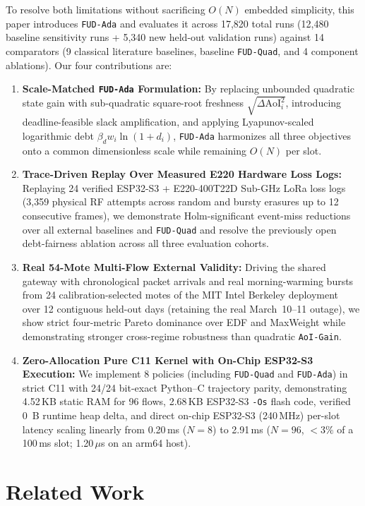 \documentclass[journal]{IEEEtran}
\begin{document}
To resolve both limitations without sacrificing $O(N)$ embedded simplicity, this paper introduces \texttt{FUD-Ada} and evaluates it across 17,820 total runs (12,480 baseline sensitivity runs + 5,340 new held-out validation runs) against 14 comparators (9 classical literature baselines, baseline \texttt{FUD-Quad}, and 4 component ablations). Our four contributions are:
\begin{enumerate}
\item \textbf{Scale-Matched \texttt{FUD-Ada} Formulation:} By replacing unbounded quadratic state gain with sub-quadratic square-root freshness $\sqrt{\Delta\text{AoI}_i^2}$, introducing deadline-feasible slack amplification, and applying Lyapunov-scaled logarithmic debt $\beta_d w_i \ln(1{+}d_i)$, \texttt{FUD-Ada} harmonizes all three objectives onto a common dimensionless scale while remaining $O(N)$ per slot.
\item \textbf{Trace-Driven Replay Over Measured E220 Hardware Loss Logs:} Replaying 24 verified ESP32-S3 + E220-400T22D Sub-GHz LoRa loss logs (3,359 physical RF attempts across random and bursty erasures up to 12 consecutive frames), we demonstrate Holm-significant event-miss reductions over all external baselines and \texttt{FUD-Quad} and resolve the previously open debt-fairness ablation across all three evaluation cohorts.
\item \textbf{Real 54-Mote Multi-Flow External Validity:} Driving the shared gateway with chronological packet arrivals and real morning-warming bursts from 24 calibration-selected motes of the MIT Intel Berkeley deployment~\cite{madden2004intel} over 12 contiguous held-out days (retaining the real March~10--11 outage), we show strict four-metric Pareto dominance over EDF and MaxWeight while demonstrating stronger cross-regime robustness than quadratic \texttt{AoI-Gain}.
\item \textbf{Zero-Allocation Pure C11 Kernel with On-Chip ESP32-S3 Execution:} We implement 8 policies (including \texttt{FUD-Quad} and \texttt{FUD-Ada}) in strict C11 with 24/24 bit-exact Python--C trajectory parity, demonstrating 4.52\,KB static RAM for 96 flows, 2.68\,KB ESP32-S3 \texttt{-Os} flash code, verified 0~B runtime heap delta, and direct on-chip ESP32-S3 (240\,MHz) per-slot latency scaling linearly from 0.20\,ms ($N{=}8$) to 2.91\,ms ($N{=}96$, $<3\%$ of a 100\,ms slot; 1.20\,$\mu$s on an arm64 host).
\end{enumerate}

\section{Related Work}
\end{document}
